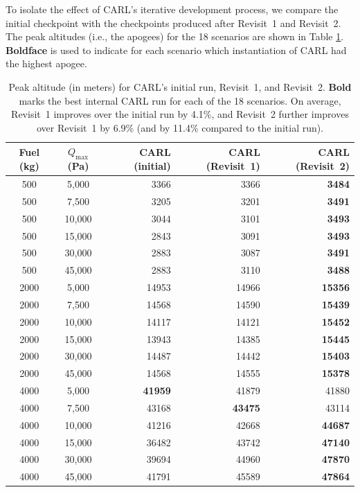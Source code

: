 \documentclass[mnsc,sglanonrev]{informs4}
\begin{document}
To isolate the effect of CARL's iterative development process, we compare the initial checkpoint with the checkpoints produced after Revisit~1 and Revisit~2. The peak altitudes (i.e., the apogees) for the 18 scenarios are shown in Table \ref{tab:god_carl_revisits}. \textbf{Boldface} is used to indicate for each scenario which instantiation of CARL had the highest apogee.

\begin{table}[ht]
\centering
\caption{Peak altitude (in meters) for CARL's initial run, Revisit~1, and Revisit~2. \textbf{Bold} marks the best internal CARL run for each of the 18 scenarios. On average, Revisit~1 improves over the initial run by 4.1\%, and Revisit~2 further improves over Revisit~1 by 6.9\% (and by 11.4\% compared to the initial run).}
\label{tab:god_carl_revisits}
\small
\begin{tabular}{cc|rrr}
\toprule
Fuel (kg) & $Q_{\max}$ (Pa) & CARL (initial) & CARL (Revisit~1) & CARL (Revisit~2) \\
\midrule
500 & 5{,}000 & 3366 & 3366 & \textbf{3484} \\
500 & 7{,}500 & 3205 & 3201 & \textbf{3491} \\
500 & 10{,}000 & 3044 & 3101 & \textbf{3493} \\
500 & 15{,}000 & 2843 & 3091 & \textbf{3493} \\
500 & 30{,}000 & 2883 & 3087 & \textbf{3491} \\
500 & 45{,}000 & 2883 & 3110 & \textbf{3488} \\
2000 & 5{,}000 & 14953 & 14966 & \textbf{15356} \\
2000 & 7{,}500 & 14568 & 14590 & \textbf{15439} \\
2000 & 10{,}000 & 14117 & 14121 & \textbf{15452} \\
2000 & 15{,}000 & 13943 & 14385 & \textbf{15445} \\
2000 & 30{,}000 & 14487 & 14442 & \textbf{15403} \\
2000 & 45{,}000 & 14568 & 14555 & \textbf{15378} \\
4000 & 5{,}000 & \textbf{41959} & 41879 & 41880 \\
4000 & 7{,}500 & 43168 & \textbf{43475} & 43114 \\
4000 & 10{,}000 & 41216 & 42668 & \textbf{44687} \\
4000 & 15{,}000 & 36482 & 43742 & \textbf{47140} \\
4000 & 30{,}000 & 39694 & 44960 & \textbf{47870} \\
4000 & 45{,}000 & 41791 & 45589 & \textbf{47864} \\
\bottomrule
\end{tabular}%
\end{table}
\end{document}
